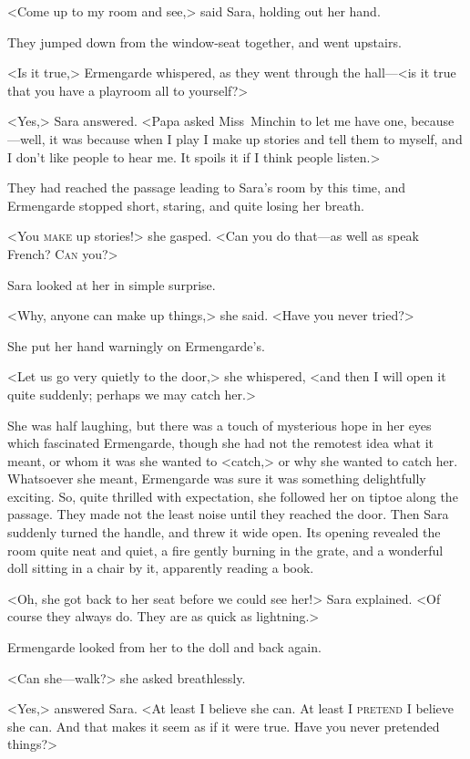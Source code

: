 <Come up to my room and see,> said Sara, holding out her hand.

They jumped down from the window-seat together, and went upstairs.

<Is it true,> Ermengarde whispered, as they went through the hall—<is it true that you have a playroom all to yourself?>

<Yes,> Sara answered. <Papa asked Miss~Minchin to let me have one, because—well, it was because when I play I make up stories and tell them to myself, and I don't like people to hear me. It spoils it if I think people listen.>

They had reached the passage leading to Sara's room by this time, and Ermengarde stopped short, staring, and quite losing her breath.

<You \textsc{make} up stories!> she gasped. <Can you do that—as well as speak French? \textsc{Can} you?>

Sara looked at her in simple surprise.

<Why, anyone can make up things,> she said. <Have you never tried?>

She put her hand warningly on Ermengarde's.

<Let us go very quietly to the door,> she whispered, <and then I will open it quite suddenly; perhaps we may catch her.>

She was half laughing, but there was a touch of mysterious hope in her eyes which fascinated Ermengarde, though she had not the remotest idea what it meant, or whom it was she wanted to <catch,> or why she wanted to catch her. Whatsoever she meant, Ermengarde was sure it was something delightfully exciting. So, quite thrilled with expectation, she followed her on tiptoe along the passage. They made not the least noise until they reached the door. Then Sara suddenly turned the handle, and threw it wide open. Its opening revealed the room quite neat and quiet, a fire gently burning in the grate, and a wonderful doll sitting in a chair by it, apparently reading a book.

<Oh, she got back to her seat before we could see her!> Sara explained. <Of course they always do. They are as quick as lightning.>

Ermengarde looked from her to the doll and back again.

<Can she—walk?> she asked breathlessly.

<Yes,> answered Sara. <At least I believe she can. At least I \textsc{pretend} I believe she can. And that makes it seem as if it were true. Have you never pretended things?>

